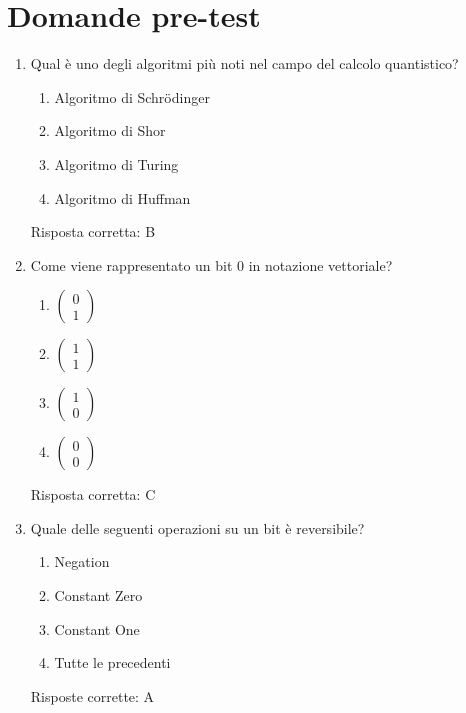\documentclass{article}
\begin{document}
\section*{Domande pre-test}

\begin{enumerate}[label=\textbf{Domanda \arabic*.}]

\item Qual è uno degli algoritmi più noti nel campo del calcolo quantistico?
\begin{enumerate}[label=\Alph*.]
    \item Algoritmo di Schrödinger
    \item Algoritmo di Shor
    \item Algoritmo di Turing
    \item Algoritmo di Huffman
\end{enumerate}
Risposta corretta: B

\item Come viene rappresentato un bit 0 in notazione vettoriale?
\begin{enumerate}[label=\Alph*.]
    \item \( \begin{pmatrix} 0 \\ 1 \end{pmatrix} \)
    \item \( \begin{pmatrix} 1 \\ 1 \end{pmatrix} \)
    \item \( \begin{pmatrix} 1 \\ 0 \end{pmatrix} \)
    \item \( \begin{pmatrix} 0 \\ 0 \end{pmatrix} \)
\end{enumerate}
Risposta corretta: C

\item Quale delle seguenti operazioni su un bit è reversibile?
\begin{enumerate}[label=\Alph*.]
    \item Negation
    \item Constant Zero
    \item Constant One
    \item Tutte le precedenti
\end{enumerate}
Risposte corrette: A


\end{enumerate}
\end{document}
